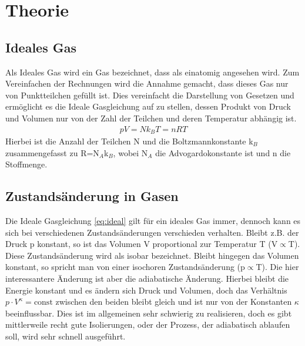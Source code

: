 \documentclass[12pt,a4paper,titlepage,headinclude,bibtotoc]{scrartcl}
\begin{document}
\section{Theorie}
\label{sec:theorie}

\subsection{Ideales Gas}
Als Ideales Gas wird ein Gas bezeichnet, dass als einatomig angesehen wird.
Zum Vereinfachen der Rechnungen wird die Annahme gemacht, dass dieses Gas nur von Punktteilchen gefüllt ist.
Dies vereinfacht die Darstellung von Gesetzen und ermöglicht es die Ideale Gasgleichung auf zu stellen, dessen Produkt von Druck und Volumen nur von der Zahl der Teilchen und deren Temperatur abhängig ist.
\begin{align}
	pV=Nk_BT=nRT\label{eq:ideal}
\end{align}
Hierbei ist die Anzahl der Teilchen N und die Boltzmannkonstante k$_B$ zusammengefasst zu R=N$_A$k$_B$, wobei N$_A$ die Advogardokonstante ist und n die Stoffmenge.
\cite[S. 261]{gerthsen}

\subsection{Zustandsänderung in Gasen}
Die Ideale Gasgleichung \eqref{eq:ideal} gilt für ein ideales Gas immer, dennoch kann es sich bei verschiedenen Zustandsänderungen verschieden verhalten.
Bleibt z.B.  der Druck p konstant, so ist das Volumen V proportional zur Temperatur T (V$\propto$T).
Diese Zustandsänderung wird als isobar bezeichnet.
Bleibt hingegen das Volumen konstant, so spricht man von einer isochoren Zustandsänderung (p$\propto$T).
Die hier interessantere Änderung ist aber die adiabatische Änderung.
Hierbei bleibt die Energie konstant und es ändern sich Druck und Volumen, doch das Verhältnis $p\cdot V^\kappa=\text{const}$ zwischen den beiden bleibt gleich und ist nur von der Konstanten $\kappa$ beeinflussbar.
Dies ist im allgemeinen sehr schwierig zu realisieren, doch es gibt mittlerweile recht gute Isolierungen, oder der Prozess, der adiabatisch ablaufen soll, wird sehr schnell ausgeführt.
\end{document}
